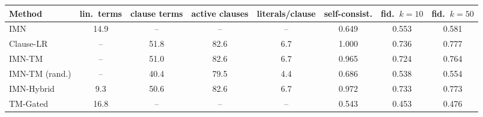 \begin{tabular}{lccccccc}
\toprule
Method & lin.\ terms & clause terms & active clauses & literals/clause & self-consist. & fid.\ $k{=}10$ & fid.\ $k{=}50$ \\
\midrule
IMN & 14.9 & -- & -- & -- & 0.649 & 0.553 & 0.581 \\
Clause-LR & -- & 51.8 & 82.6 & 6.7 & 1.000 & 0.736 & 0.777 \\
IMN-TM & -- & 51.0 & 82.6 & 6.7 & 0.965 & 0.724 & 0.764 \\
IMN-TM (rand.) & -- & 40.4 & 79.5 & 4.4 & 0.686 & 0.538 & 0.554 \\
IMN-Hybrid & 9.3 & 50.6 & 82.6 & 6.7 & 0.972 & 0.733 & 0.773 \\
TM-Gated & 16.8 & -- & -- & -- & 0.543 & 0.453 & 0.476 \\
\bottomrule
\end{tabular}
